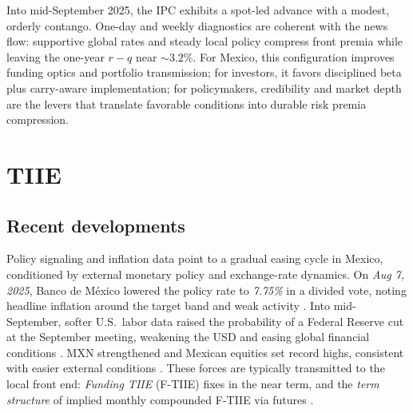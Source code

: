 \documentclass[11pt,a4paper]{article} %
\let\oldsection\section
\renewcommand{\section}{%
    \clearpage
    \thispagestyle{myfancy}%
    \oldsection
  }
\begin{document}
\medskip
Into mid-September 2025, the IPC exhibits a spot-led advance with a modest, orderly contango. One-day and weekly diagnostics are coherent with the news flow: supportive global rates and steady local policy compress front premia while leaving the one-year \(r-q\) near \(\sim 3.2\%\). For Mexico, this configuration improves funding optics and portfolio transmission; for investors, it favors disciplined beta plus carry-aware implementation; for policymakers, credibility and market depth are the levers that translate favorable conditions into durable risk premia compression.































\section{TIIE}

\subsection{Recent developments}
Policy signaling and inflation data point to a gradual easing cycle in Mexico, conditioned by external monetary policy and exchange-rate dynamics. On \emph{Aug 7, 2025}, Banco de México lowered the policy rate to \textit{7.75\%} in a divided vote, noting headline inflation around the target band and weak activity \citep{reuters_banxico_cut_aug25,banxico_mps_aug7_2025}. Into mid-September, softer U.S.\ labor data raised the probability of a Federal Reserve cut at the September meeting, weakening the USD and easing global financial conditions \citep{reuters_global_cuts_sep11a,reuters_global_cuts_sep11b}. MXN strengthened and Mexican equities set record highs, consistent with easier external conditions \citep{reuters_mxn_sept15}. These forces are typically transmitted to the local front end: \emph{Funding TIIE} (F-TIIE) fixes in the near term, and the \emph{term structure} of implied monthly compounded F-TIIE via futures \citep{frbny_sofr_page,fred_sofr}.
\end{document}
